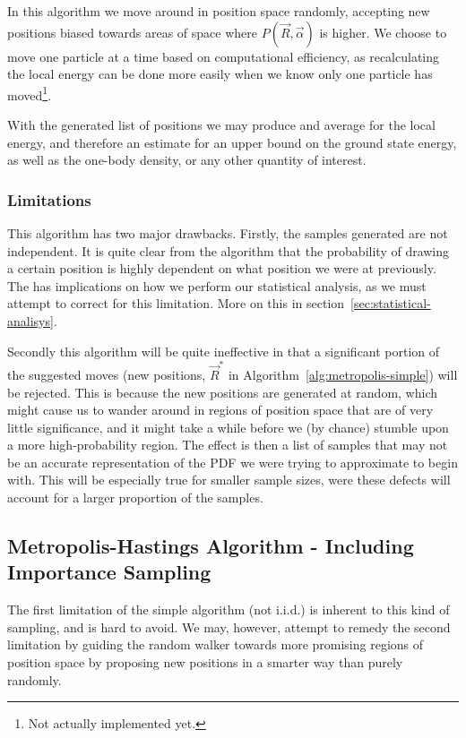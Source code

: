 \documentclass[a4paper, 11pt]{article}
\begin{document}
\begin{multicols}{2}
In this algorithm we move around in position space randomly, accepting new
positions biased towards areas of space where $P(\vec R,\vec\alpha)$ is higher.
We choose to move one particle at a time based on computational efficiency, as
recalculating the local energy can be done more easily when we know only one
particle has moved\footnote{Not actually implemented yet.}.

With the generated list of positions we may produce and average for the local
energy, and therefore an estimate for an upper bound on the ground state energy,
as well as the one-body density, or any other quantity of interest.

\subsubsection{Limitations}
This algorithm has two major drawbacks. Firstly, the samples generated are not
independent. It is quite clear from the algorithm that the probability of
drawing a certain position is highly dependent on what position we were at
previously. The has implications on how we perform our statistical analysis, as
we must attempt to correct for this limitation. More on this in
section~\ref{sec:statistical-analisys}.

Secondly this algorithm will be quite ineffective in that a significant portion
of the suggested moves (new positions, $\vec R^*$ in
Algorithm~\ref{alg:metropolis-simple}) will be rejected. This is because the new
positions are generated at random, which might cause us to wander around in
regions of position space that are of very little significance, and it might
take a while before we (by chance) stumble upon a more high-probability region.
The effect is then a list of samples that may not be an accurate representation
of the PDF we were trying to approximate to begin with. This will be especially
true for smaller sample sizes, were these defects will account for a larger
proportion of the samples.


\subsection{Metropolis-Hastings Algorithm - Including Importance Sampling}
The first limitation of the simple algorithm (not i.i.d.) is inherent to this
kind of sampling, and is hard to avoid. We may, however, attempt to remedy the
second limitation by guiding the random walker towards more promising regions of
position space by proposing new positions in a smarter way than purely randomly.


\end{multicols}
\end{document}
